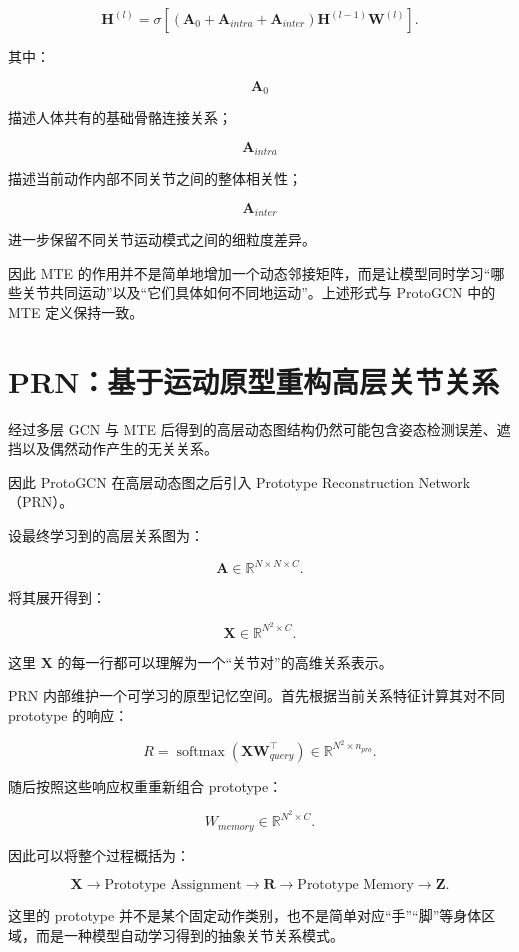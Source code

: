 \[
\mathbf H^{(l)}
=
\sigma
\left[
(
\mathbf A_0
+
\mathbf A_{intra}
+
\mathbf A_{inter}
)
\mathbf H^{(l-1)}
\mathbf W^{(l)}
\right].
\]

其中：

\[
\mathbf A_0
\]

描述人体共有的基础骨骼连接关系；

\[
\mathbf A_{intra}
\]

描述当前动作内部不同关节之间的整体相关性；

\[
\mathbf A_{inter}
\]

进一步保留不同关节运动模式之间的细粒度差异。

因此 MTE 的作用并不是简单地增加一个动态邻接矩阵，而是让模型同时学习“哪些关节共同运动”以及“它们具体如何不同地运动”。上述形式与 ProtoGCN 中的 MTE 定义保持一致。


\section{PRN：基于运动原型重构高层关节关系}

经过多层 GCN 与 MTE 后得到的高层动态图结构仍然可能包含姿态检测误差、遮挡以及偶然动作产生的无关关系。

因此 ProtoGCN 在高层动态图之后引入 Prototype Reconstruction Network（PRN）。

设最终学习到的高层关系图为：

\[
\mathbf A
\in
\mathbb R^{N\times N\times C}.
\]

将其展开得到：

\[
\mathbf X
\in
\mathbb R^{N^2\times C}.
\]

这里 \(\mathbf X\) 的每一行都可以理解为一个“关节对”的高维关系表示。

PRN 内部维护一个可学习的原型记忆空间。首先根据当前关系特征计算其对不同 prototype 的响应：

\[
R
=
\operatorname{softmax}
\left(
\mathbf X
\mathbf W_{query}^{\top}
\right)
\in
\mathbb R^{N^2\times n_{pro}}.
\]

随后按照这些响应权重重新组合 prototype：

\[
W_{memory}
\in
\mathbb R^{N^2\times C}.
\]

因此可以将整个过程概括为：

\[
\mathbf X
\rightarrow
\text{Prototype Assignment}
\rightarrow
\mathbf R
\rightarrow
\text{Prototype Memory}
\rightarrow
\mathbf Z.
\]

这里的 prototype 并不是某个固定动作类别，也不是简单对应“手”“脚”等身体区域，而是一种模型自动学习得到的抽象关节关系模式。

